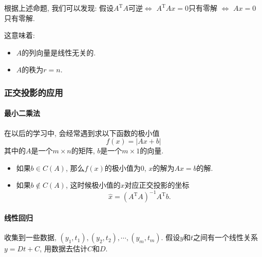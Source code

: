 根据上述命题, 我们可以发现: 假设$A^{\mathrm{T}}A$可逆$\iff$ $A^{\mathrm{T}}Ax = 0$只有零解 $\iff$ $Ax =0 $只有零解.

这意味着:
\begin{itemize}
    \item $A$的列向量是线性无关的.
    
    \item $A$的秩为$r = n$. 
\end{itemize}

\subsubsection{正交投影的应用}
\paragraph{最小二乘法}
在以后的学习中, 会经常遇到求以下函数的极小值
\begin{equation}
  f(x) = \left| Ax + b \right|
\end{equation}
其中的$A$是一个$m \times n$的矩阵, $b$是一个$m \times 1$的向量.
\begin{itemize}
    \item 如果$b \in C(A)$, 那么$f(x)$的极小值为$0$, $x$的解为$A x = b$的解.
    \item 如果$b \notin C(A)$, 这时候极小值的$x$对应正交投影的坐标
    \begin{equation}
      \hat{x} = \left( A^{\mathrm{T}}A \right) ^{-1} A^{\mathrm{T}} b.
    \end{equation}
\end{itemize}

\paragraph{线性回归}
收集到一些数据, $(y_1,t_1), (y_2,t_2) , \cdots, (y_m, t_m)$. 假设$y$和$t$之间有一个线性关系$y = Dt +C$, 用数据去估计$C$和$D$.

